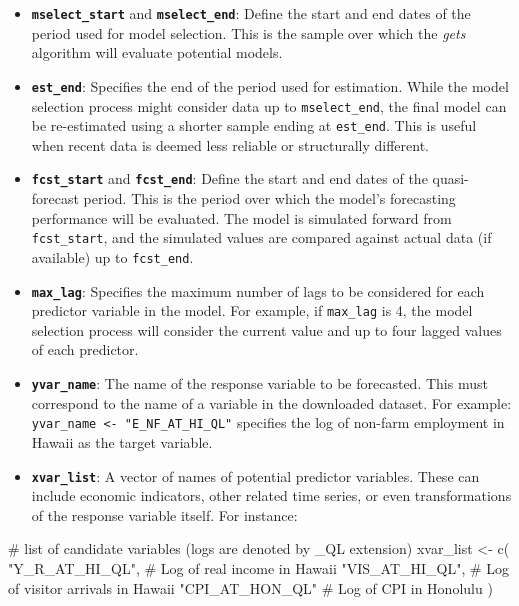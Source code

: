 \documentclass[
  letterpaper,
  DIV=11,
  numbers=noendperiod]{scrreport}
\newenvironment{Shaded}{\begin{snugshade}}{\end{snugshade}}
\newcommand{\CommentTok}[1]{\textcolor[rgb]{0.37,0.37,0.37}{#1}}
\newcommand{\FunctionTok}[1]{\textcolor[rgb]{0.28,0.35,0.67}{#1}}
\newcommand{\NormalTok}[1]{\textcolor[rgb]{0.00,0.23,0.31}{#1}}
\newcommand{\OtherTok}[1]{\textcolor[rgb]{0.00,0.23,0.31}{#1}}
\newcommand{\StringTok}[1]{\textcolor[rgb]{0.13,0.47,0.30}{#1}}
\providecommand{\tightlist}{%
  \setlength{\itemsep}{0pt}\setlength{\parskip}{0pt}}\usepackage{longtable,booktabs,array}
\begin{document}
\begin{itemize}
\tightlist
\item
  \textbf{\texttt{mselect\_start}} and \textbf{\texttt{mselect\_end}}:
  Define the start and end dates of the period used for model selection.
  This is the sample over which the \emph{gets} algorithm will evaluate
  potential models.\\
\item
  \textbf{\texttt{est\_end}}: Specifies the end of the period used for
  estimation. While the model selection process might consider data up
  to \texttt{mselect\_end}, the final model can be re-estimated using a
  shorter sample ending at \texttt{est\_end}. This is useful when recent
  data is deemed less reliable or structurally different.\\
\item
  \textbf{\texttt{fcst\_start}} and \textbf{\texttt{fcst\_end}}: Define
  the start and end dates of the quasi-forecast period. This is the
  period over which the model's forecasting performance will be
  evaluated. The model is simulated forward from \texttt{fcst\_start},
  and the simulated values are compared against actual data (if
  available) up to \texttt{fcst\_end}.\\
\item
  \textbf{\texttt{max\_lag}}: Specifies the maximum number of lags to be
  considered for each predictor variable in the model. For example, if
  \texttt{max\_lag} is 4, the model selection process will consider the
  current value and up to four lagged values of each predictor.\\
\item
  \textbf{\texttt{yvar\_name}}: The name of the response variable to be
  forecasted. This must correspond to the name of a variable in the
  downloaded dataset. For example:
  \texttt{yvar\_name\ \textless{}-\ "E\_NF\_AT\_HI\_QL"} specifies the
  log of non-farm employment in Hawaii as the target variable.\\
\item
  \textbf{\texttt{xvar\_list}}: A vector of names of potential predictor
  variables. These can include economic indicators, other related time
  series, or even transformations of the response variable itself. For
  instance:\\
\end{itemize}

\begin{Shaded}
\begin{Highlighting}[]
\CommentTok{\# list of candidate variables (logs are denoted by \_QL extension)}
\NormalTok{xvar\_list }\OtherTok{\textless{}{-}} \FunctionTok{c}\NormalTok{(}
  \StringTok{"Y\_R\_AT\_HI\_QL"}\NormalTok{, }\CommentTok{\# Log of real income in Hawaii}
  \StringTok{"VIS\_AT\_HI\_QL"}\NormalTok{, }\CommentTok{\# Log of visitor arrivals in Hawaii         }
  \StringTok{"CPI\_AT\_HON\_QL"} \CommentTok{\# Log of CPI in Honolulu}
\NormalTok{)}
\end{Highlighting}
\end{Shaded}
\end{document}
